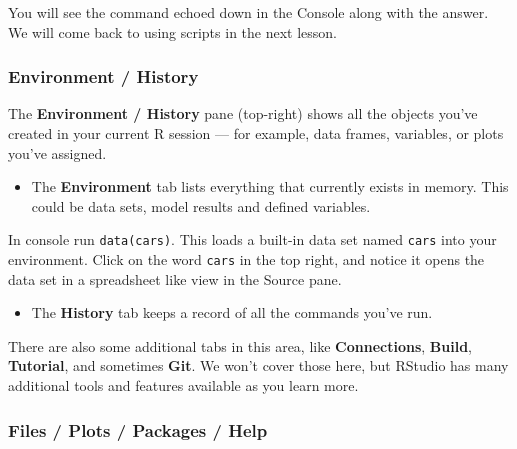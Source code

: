 \documentclass[
  letterpaper,
  DIV=11,
  numbers=noendperiod,
  oneside]{scrreprt}
\providecommand{\tightlist}{%
  \setlength{\itemsep}{0pt}\setlength{\parskip}{0pt}}\usepackage{longtable,booktabs,array}
\begin{document}
You will see the command echoed down in the Console along with the
answer. We will come back to using scripts in the next lesson.

\subsubsection*{Environment / History}\label{environment-history}

The \textbf{Environment / History} pane (top-right) shows all the
objects you've created in your current R session --- for example, data
frames, variables, or plots you've assigned.

\begin{itemize}
\tightlist
\item
  The \textbf{Environment} tab lists everything that currently exists in
  memory. This could be data sets, model results and defined variables.
\end{itemize}

\begin{tcolorbox}[enhanced jigsaw, bottomrule=.15mm, colback=white, colframe=quarto-callout-tip-color-frame, toprule=.15mm, coltitle=black, rightrule=.15mm, opacitybacktitle=0.6, colbacktitle=quarto-callout-tip-color!10!white, toptitle=1mm, leftrule=.75mm, breakable, bottomtitle=1mm, titlerule=0mm, title={👉 Your Turn}, arc=.35mm, left=2mm, opacityback=0]

In console run \texttt{data(cars)}. This loads a built-in data set named
\texttt{cars} into your environment. Click on the word \texttt{cars} in
the top right, and notice it opens the data set in a spreadsheet like
view in the Source pane.

\end{tcolorbox}

\begin{itemize}
\tightlist
\item
  The \textbf{History} tab keeps a record of all the commands you've
  run.
\end{itemize}

There are also some additional tabs in this area, like
\textbf{Connections}, \textbf{Build}, \textbf{Tutorial}, and sometimes
\textbf{Git}. We won't cover those here, but RStudio has many additional
tools and features available as you learn more.

\subsubsection*{Files / Plots / Packages /
Help}\label{files-plots-packages-help}
\end{document}
